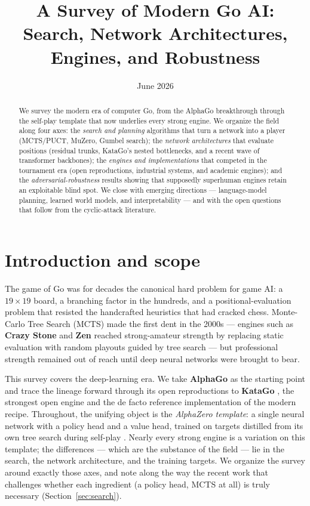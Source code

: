 \documentclass[11pt]{article}
\title{A Survey of Modern Go AI:\\
       Search, Network Architectures, Engines, and Robustness}
\author{}
\date{June 2026}
\begin{document}
\maketitle

\begin{abstract}
We survey the modern era of computer Go, from the AlphaGo breakthrough through the
self-play template that now underlies every strong engine. We organize the field along
four axes: the \emph{search and planning} algorithms that turn a network into a player
(MCTS/PUCT, MuZero, Gumbel search); the \emph{network architectures} that evaluate
positions (residual trunks, KataGo's nested bottlenecks, and a recent wave of
transformer backbones); the \emph{engines and implementations} that competed in the
tournament era (open reproductions, industrial systems, and academic engines); and the
\emph{adversarial-robustness} results showing that supposedly superhuman engines retain
an exploitable blind spot. We close with emerging directions --- language-model
planning, learned world models, and interpretability --- and with the open questions
that follow from the cyclic-attack literature.
\end{abstract}

\section{Introduction and scope}
The game of Go was for decades the canonical hard problem for game AI: a $19\times19$
board, a branching factor in the hundreds, and a positional-evaluation problem that
resisted the handcrafted heuristics that had cracked chess. Monte-Carlo Tree Search
(MCTS) made the first dent in the 2000s --- engines such as \textbf{Crazy Stone} and
\textbf{Zen} reached strong-amateur strength by replacing static evaluation with random
playouts guided by tree search \cite{cgisurvey2016} --- but professional strength
remained out of reach until deep neural networks were brought to bear.

This survey covers the deep-learning era. We take \textbf{AlphaGo}
\cite{alphago2016} as the starting point and trace the lineage forward through its open
reproductions to \textbf{KataGo} \cite{katago2019}, the strongest open engine and the
de facto reference implementation of the modern recipe. Throughout, the unifying object
is the \emph{AlphaZero template}: a single neural network with a policy head and a value
head, trained on targets distilled from its own tree search during self-play
\cite{alphazero2018}. Nearly every strong engine is a variation on this template; the
differences --- which are the substance of the field --- lie in the search, the network
architecture, and the training targets. We organize the survey around exactly those axes,
and note along the way the recent work that challenges whether each ingredient (a policy
head, MCTS at all) is truly necessary (Section~\ref{sec:search}).
\end{document}
